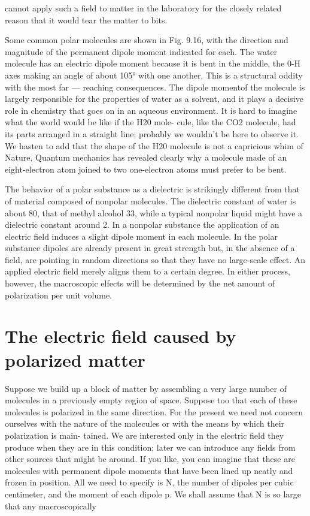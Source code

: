 {cannot apply such a field to matter in the laboratory for the closely related reason that
it would tear the matter to bits.

Some common polar molecules are shown in Fig. 9.16, with the
direction and magnitude of the permanent dipole moment indicated
for each. The water molecule has an electric dipole moment because
it is bent in the middle, the 0-H axes making an angle of about 105°
with one another. This is a structural oddity with the most far --- reaching
consequences. The dipole momentof the molecule is largely
responsible for the properties of water as a solvent, and it plays a
decisive role in chemistry that goes on in an aqueous environment.
It is hard to imagine what the world would be like if the H20 mole-
cule, like the CO2 molecule, had its parts arranged in a straight line;
probably we wouldn't be here to observe it. We hasten to add that
the shape of the H20 molecule is not a capricious whim of Nature.
Quantum mechanics has revealed clearly why a molecule made of
an eight-electron atom joined to two one-electron atoms must prefer
to be bent.

The behavior of a polar substance as a dielectric is strikingly different
from that of material composed of nonpolar molecules. The
dielectric constant of water is about 80, that of methyl alcohol 33,
while a typical nonpolar liquid might have a dielectric constant
around 2. In a nonpolar substance the application of an electric field
induces a slight dipole moment in each molecule. In the polar substance
dipoles are already present in great strength but, in the
absence of a field, are pointing in random directions so that they have
no large-scale effect. An applied electric field merely aligns them to
a certain degree. In either process, however, the macroscopic elfects
will be determined by the net amount of polarization per unit volume.

\section{The electric field caused by polarized matter}

Suppose we build up a block of matter by assembling a very large
number of molecules in a previously empty region of space. Suppose
too that each of these molecules is polarized in the same direction.
For the present we need not concern ourselves with the nature of the
molecules or with the means by which their polarization is main-
tained. We are interested only in the electric field they produce when
they are in this condition; later we can introduce any fields from other
sources that might be around. If you like, you can imagine that these
are molecules with permanent dipole moments that have been lined
up neatly and frozen in position. All we need to specify is N, the
number of dipoles per cubic centimeter, and the moment of each
dipole p. We shall assume that N is so large that any macroscopically

}
